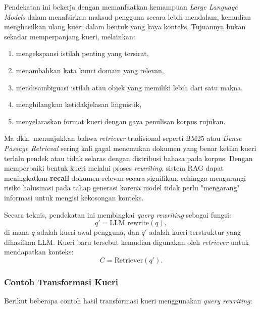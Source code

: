 Pendekatan ini bekerja dengan memanfaatkan kemampuan \textit{Large Language Models} dalam menafsirkan maksud pengguna secara lebih mendalam, kemudian menghasilkan ulang kueri dalam bentuk yang kaya konteks. Tujuannya bukan sekadar memperpanjang kueri, melainkan:
\begin{enumerate}[1.]
  \item mengekspansi istilah penting yang tersirat,
  \item menambahkan kata kunci domain yang relevan,
  \item mendisambiguasi istilah atau objek yang memiliki lebih dari satu makna,
  \item menghilangkan ketidakjelasan linguistik,
  \item menyelaraskan format kueri dengan gaya penulisan korpus rujukan.
\end{enumerate}



Ma dkk.\ menunjukkan bahwa \textit{retriever} tradisional seperti BM25 atau \textit{Dense Passage Retrieval} sering kali gagal menemukan dokumen yang benar ketika kueri terlalu pendek atau tidak selaras dengan distribusi bahasa pada korpus. Dengan memperbaiki bentuk kueri melalui proses \textit{rewriting}, sistem RAG dapat meningkatkan \textbf{recall} dokumen relevan secara signifikan, sehingga mengurangi risiko halusinasi pada tahap generasi karena model tidak perlu "mengarang" informasi untuk mengisi kekosongan konteks.

Secara teknis, pendekatan ini membingkai \textit{query rewriting} sebagai fungsi:
\[
q' = \text{LLM\_rewrite}(q),
\]
di mana $q$ adalah kueri awal pengguna, dan $q'$ adalah kueri terstruktur yang dihasilkan LLM. Kueri baru tersebut kemudian digunakan oleh \textit{retriever} untuk mendapatkan konteks:
\[
C = \text{Retriever}(q').
\]

\subsubsection*{Contoh Transformasi Kueri}
Berikut beberapa contoh hasil transformasi kueri menggunakan \textit{query rewriting}:

